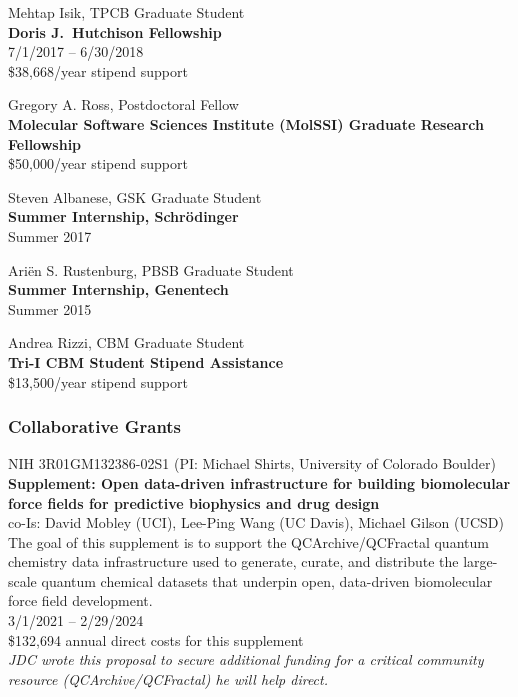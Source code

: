 \documentclass[10pt]{article}
\begin{document}
\vspace{1.5ex}

Mehtap Isik, TPCB Graduate Student\\
{\bf Doris J.~Hutchison Fellowship}\\
7/1/2017 -- 6/30/2018\\
\$38,668/year stipend support

\vspace{1.5ex}

Gregory A. Ross, Postdoctoral Fellow\\
{\bf Molecular Software Sciences Institute (MolSSI) Graduate Research Fellowship}\\
\$50,000/year stipend support

\vspace{1.5ex}

Steven Albanese, GSK Graduate Student\\
{\bf Summer Internship, Schr\"{o}dinger}\\
Summer 2017

\vspace{1.5ex}

Ari\"{e}n S. Rustenburg, PBSB Graduate Student\\
{\bf Summer Internship, Genentech}\\
Summer 2015

\vspace{1.5ex}

Andrea Rizzi, CBM Graduate Student\\
{\bf Tri-I CBM Student Stipend Assistance}\\
\$13,500/year stipend support

\color{black}

\subsubsection*{Collaborative Grants}

NIH 3R01GM132386-02S1 (PI: Michael Shirts, University of Colorado Boulder)\\
{\bf Supplement: Open data-driven infrastructure for building biomolecular force fields for predictive biophysics and drug design}\\
co-Is: David Mobley (UCI), Lee-Ping Wang (UC Davis), Michael Gilson (UCSD) \\
The goal of this supplement is to support the QCArchive/QCFractal quantum chemistry data infrastructure used to generate, curate, and distribute the large-scale quantum chemical datasets that underpin open, data-driven biomolecular force field development.\\
3/1/2021 -- 2/29/2024\\
\$132,694 annual direct costs for this supplement\\
\emph{JDC wrote this proposal to secure additional funding for a critical community resource (QCArchive/QCFractal) he will help direct.}
\end{document}
